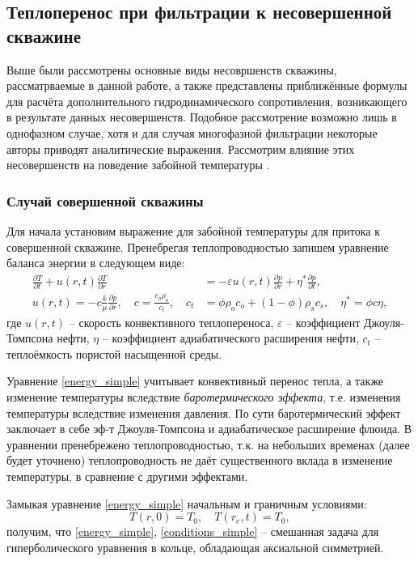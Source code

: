 \subsection{Теплоперенос при фильтрации к несовершенной скважине}
	Выше были рассмотрены основные виды несовршенств скважины, рассматрваемые в данной работе, а также представлены приближённые формулы для расчёта дополнительного гидродинамического сопротивления, возникающего в результате данных несовершенств.
	Подобное рассмотрение возможно лишь в однофазном случае, хотя и для случая многофазной фильтрации некоторые авторы приводят аналитические выражения.
	Рассмотрим влияние этих несовершенств на поведение забойной температуры \cite{ramazanov_spe}.

\subsubsection{Случай совершенной скважины}
	Для начала установим выражение для забойной температуры для притока к совершенной скважине.
	Пренебрегая теплопроводностью запишем уравнение баланса энергии в следующем виде:
\begin{align}
	\label{energy_simple}
	\frac{\partial{T}}{\partial{t}}+u(r, t)\frac{\partial{T}}{\partial{r}} &= -\varepsilon u(r, t)\frac{\partial p}{\partial{r}}
	+\eta^{\ast}\frac{\partial{p}}{\partial{t}}, \\
	u(r, t) = -c\frac{k}{\mu}\frac{\partial{p}}{\partial{r}}, \quad c = \frac{c_o \rho_o}{c_t},  \quad
	c_t &= \phi \rho_o c_o + (1-\phi)\rho_{s}c_s, \quad \eta^{\ast} = \phi c \eta,
\end{align}
	где $u(r, t)$ -- скорость конвективного теплопереноса,
	$\varepsilon$ -- коэффициент Джоуля-Томпсона нефти,
	$\eta$ -- коэффициент адиабатического расширения нефти,
	$c_t$ -- теплоёмкость пористой насыщенной среды.
	
	Уравнение \eqref{energy_simple} учитывает конвективный перенос тепла, а также изменение температуры вследствие 
	\textit{баротермического эффекта}, т.е. изменения температуры вследствие изменения давления.
	По сути баротермический эффект заключает в себе эф-т Джоуля-Томпсона и адиабатическое расширение флюида.
	В уравнении пренебрежено теплопроводностью, т.к. на небольших временах (далее будет уточнено) теплопроводность не даёт существенного вклада в изменение температуры, в сравнение с другими эффектами.

	Замыкая уравнение \eqref{energy_simple} начальным и граничным условиями:
\begin{equation}
	\label{conditions_simple}
	T(r, 0) = T_0, \quad T(r_e, t) = T_0,
\end{equation}
	получим, что \eqref{energy_simple}, \eqref{conditions_simple} -- смешанная задача для гиперболического уравнения в кольце, обладающая аксиальной симметрией.

